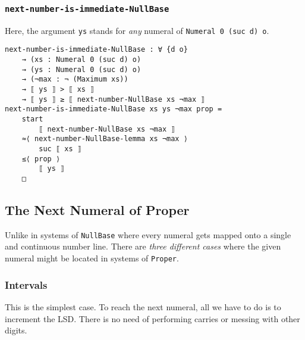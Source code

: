 \documentclass[\main/thesis.tex]{subfiles}
\begin{document}
\subsubsection{{\lstinline|next-number-is-immediate-NullBase|}}

Here, the argument {\lstinline|ys|} stands for \textit{any} numeral of {\lstinline|Numeral 0 (suc d) o|}.

\begin{lstlisting}
next-number-is-immediate-NullBase : ∀ {d o}
    → (xs : Numeral 0 (suc d) o)
    → (ys : Numeral 0 (suc d) o)
    → (¬max : ¬ (Maximum xs))
    → ⟦ ys ⟧ > ⟦ xs ⟧
    → ⟦ ys ⟧ ≥ ⟦ next-number-NullBase xs ¬max ⟧
next-number-is-immediate-NullBase xs ys ¬max prop =
    start
        ⟦ next-number-NullBase xs ¬max ⟧
    ≈⟨ next-number-NullBase-lemma xs ¬max ⟩
        suc ⟦ xs ⟧
    ≤⟨ prop ⟩
        ⟦ ys ⟧
    □
\end{lstlisting}

\subsection{The Next Numeral of Proper}

Unlike in systems of {\lstinline|NullBase|} where every numeral gets mapped onto
a single and continuous number line.
There are \textit{three different cases} where the given numeral might be located
in systems of {\lstinline|Proper|}.

\subsubsection{Intervals}

This is the simplest case.
To reach the next numeral, all we have to do is to increment the LSD.
There is no need of performing carries or messing with other digits.
\end{document}

